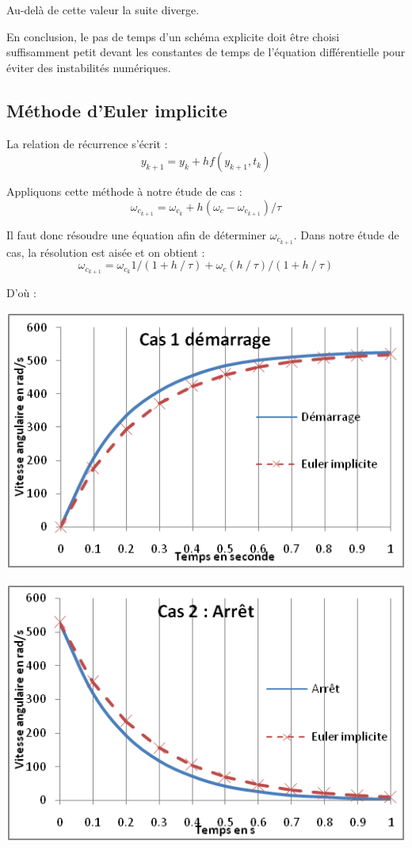 \documentclass[10pt]{article}
\begin{document}
Au-delà de  cette valeur la suite diverge.

En conclusion, le pas de temps d’un schéma explicite doit être choisi suffisamment petit devant les constantes de temps de l’équation différentielle pour éviter des instabilités numériques.

\subsection{Méthode d'Euler implicite}
La relation de récurrence s’écrit : 
$$y_{k+1}=y_k+hf(y_{k+1},t_k)$$

Appliquons cette méthode à notre étude de cas :
$$\omega_{c_{k+1}}=\omega_{c_k}+h (\omega_c-\omega_{c_{k+1}})/\tau$$

Il faut donc résoudre une équation afin de déterminer $\omega_{c_{k+1}}$. Dans notre étude de cas, la résolution est aisée et on obtient :
$$\omega_{c_{k+1}}=\omega_{c_k}  1/(1+h⁄\tau)+\omega_c (h⁄\tau)/(1+h⁄\tau)$$

D’où :


\begin{minipage}[c]{.47\linewidth}
\begin{center}
\includegraphics[width=.95\textwidth]{images/fig_09}
\end{center}
\end{minipage}
\hfill
\begin{minipage}[c]{.47\linewidth}
\begin{center}
\includegraphics[width=.95\textwidth]{images/fig_10}
\end{center}
\end{minipage}
\end{document}
